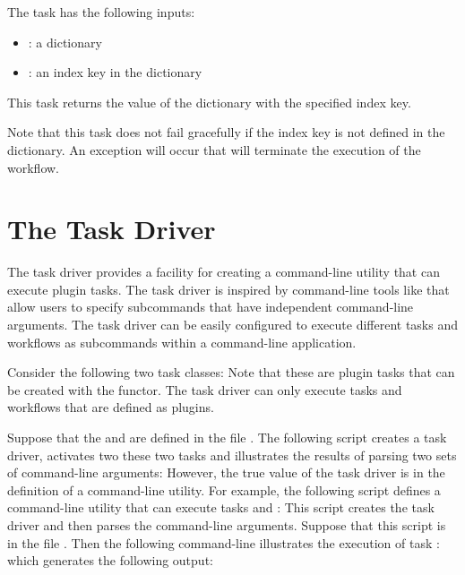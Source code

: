 The  task has the following inputs:
\begin{itemize}

\item {}: a dictionary
\item {}: an index key in the dictionary
\end{itemize}
This task returns the value of the dictionary with the specified index key.

Note that this task does not fail gracefully if the index key is not defined in the
dictionary.  An exception will occur that will terminate the execution of the 
workflow.


\section{The Task Driver}

The \pwsp task driver provides a facility for creating a command-line
utility that can execute \pwsp plugin tasks.  The task driver is inspired
by command-line tools like  that allow users to specify
subcommands that have independent command-line arguments.
The \pwsp task driver can be easily configured to execute different
tasks and workflows as subcommands within a command-line application.

Consider the following two task classes:
Note that these are plugin tasks that can be created with the  functor.  The \pwsp task
driver can only execute tasks and workflows that are defined as plugins.

Suppose that the 
 and  are defined in the file .
The following script creates a task driver, activates two these two tasks and illustrates the results of
parsing two sets of command-line arguments:
However, the true value of the task driver is in the definition of a command-line utility.
For example, the following script defines a
command-line utility that can execute tasks  and :
This script creates the task driver and then parses the  command-line arguments.
Suppose that this script is in the file .  Then the following command-line illustrates the
execution of task :
which generates the following output:

